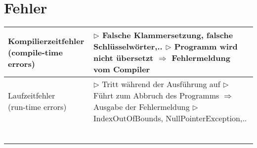 \section{Fehler}
	\begin{tabular}{ | p{4cm} p{13.5cm} | }
	\hline
	\makecell[l]{Kompilierzeitfehler \\ (compile-time errors)} & 
	\makecell[l]{$\rhd$ Falsche Klammersetzung, falsche Schlüsselwörter,..\\
	$\rhd$ Programm wird nicht übersetzt $\Rightarrow$ Fehlermeldung vom Compiler } \\ \hline
	
	\makecell[l]{Laufzeitfehler \\ (run-time errors)} & 
	\makecell[l]{$\rhd$ Tritt während der Ausführung auf \\
	$\rhd$ Führt zum Abbruch des Programms $\Rightarrow$ Ausgabe der Fehlermeldung \\
	$\rhd$ IndexOutOfBounds, NullPointerException,.. } \\ \hline
	
	\makecell[l]{} & \makecell[l]{$\rhd$  } \\ \hline
	
	\makecell[l]{} & \makecell[l]{$\rhd$  } \\ \hline
	
	\makecell[l]{} & \makecell[l]{$\rhd$  } \\ \hline
	
	\makecell[l]{} & \makecell[l]{$\rhd$  } \\ \hline
	
	\makecell[l]{} & \makecell[l]{$\rhd$  } \\ \hline
	
	\makecell[l]{} & \makecell[l]{$\rhd$  } \\ \hline
	\end{tabular}

